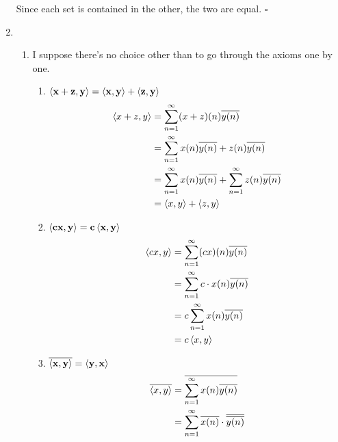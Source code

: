 \documentclass[12pt]{article}
\begin{document}
\begin{enumerate}
            Since each set is contained in the other, the two are equal. $\square$
      \item \begin{enumerate}
                  \item I suppose there's no choice other than to go through the axioms one by one.
                        \begin{enumerate}
                              \item $\mathbf{\braket{x+z, y}=\braket{x,y}+\braket{z, y}}$
                                    \begin{align*}
                                          \braket{x+z, y} & = \sum_{n=1}^{\infty} (x+z)(n)\overline{y(n)}                                     \\
                                                          & = \sum_{n=1}^{\infty} x(n)\overline{y(n)}+z(n)\overline{y(n)}                     \\
                                                          & = \sum_{n=1}^{\infty} x(n)\overline{y(n)}+\sum_{n=1}^{\infty} z(n)\overline{y(n)} \\
                                                          & = \braket{x, y}+\braket{z, y}
                                    \end{align*}
                              \item $\mathbf{\braket{cx, y}=c\braket{x, y}}$
                                    \begin{align*}
                                          \braket{cx, y} & = \sum_{n=1}^{\infty} (cx)(n)\overline{y(n)}      \\
                                                         & = \sum_{n=1}^{\infty} c \cdot x(n)\overline{y(n)} \\
                                                         & = c\sum_{n=1}^{\infty} x(n)\overline{y(n)}        \\
                                                         & = c\braket{x, y}
                                    \end{align*}
                              \item $\mathbf{\overline{\braket{x, y}}=\braket{y, x}}$
                                    \begin{align*}
                                          \overline{\braket{x, y}} & = \overline{\sum_{n=1}^{\infty} x(n)\overline{y(n)}}                   \\
                                                                   & = \sum_{n=1}^{\infty} \overline{x(n)} \cdot \overline{\overline{y(n)}} \\

\end{align*}
\end{enumerate}
\end{enumerate}
\end{enumerate}
\end{document}
